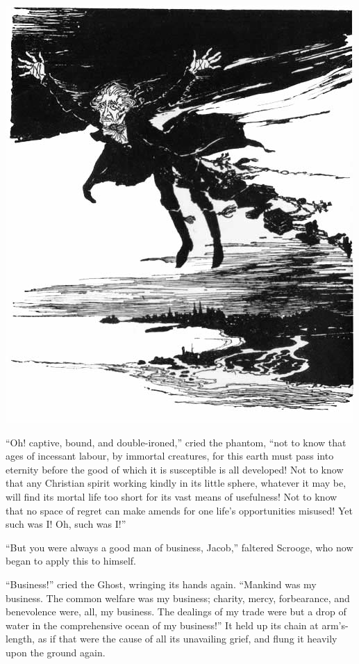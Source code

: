 \documentclass[paper=5.5in:8.5in,BCOR=5mm,twoside,DIV=calc,12pt,usegeometry]{scrbook} %
\begin{document}
\cleardoubleevenemptypage
\begin{center} 
\vfill
    \includegraphics[width=\columnwidth]{gs045}
    \vfill

\end{center}

\enquote{Oh! captive, bound, and double-ironed,} cried the phantom, \enquote{not to know that ages of incessant labour, by immortal creatures, for this earth must pass into eternity before the good of which it is susceptible is all developed! Not to know that any Christian spirit working kindly in its little sphere, whatever it may be, will find its mortal life too short for its vast means of usefulness! Not to know that no space of regret can make amends for one life's opportunities misused! Yet such was I! Oh, such was I!}

\newpage

\enquote{But you were always a good man of business, Jacob,} faltered Scrooge, who now began to apply this to himself.

\enquote{Business!} cried the Ghost, wringing its hands again. \enquote{Mankind was my business. The common welfare was my business; charity, mercy, forbearance, and benevolence were, all, my business. The dealings of my trade were but a drop of water in the comprehensive ocean of my business!}
It held up its chain at arm's-length, as if that were the cause of all its unavailing grief, and flung it heavily upon the ground again.
\end{document}
